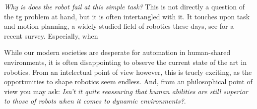\textit{Why is does the robot fail at this simple task?} This is not directly a
question of the \ac{tg} problem at hand, but it is often intertangled with it.
It touches upon task and motion planning, a widely studied field of robotics
these days, see \cite{garrett2021integrated} for a recent survey. Especially,
when 


While our modern societies are desperate for automation in human-shared
environments, it is often disappointing to observe the current state of the art
in robotics. From an intelectual point of view however, this is truely exciting,
as the opportunities to shape robotics seem endless. And, from an philosophical
point of view you may ask: \textit{Isn't it quite reassuring that human
abilities are still superior to those of robots when it comes to dynamic
environments?}.
